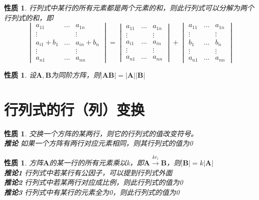 \documentclass[12pt,oneside]{ctexbook}
\newtheorem{property}[subsection]{性质}
\begin{document}
\begin{property}
    行列式中某行的所有元素都是两个元素的和，则此行列式可以分解为两个行列式的和，即
    \[\begin{vmatrix}
        a_{11}&\dots&a_{1n}
        \\\vdots&&\vdots
        \\a_{i1}+b_1&\dots&a_{in}+b_n
        \\\vdots&&\vdots
        \\a_{n1}&\dots&a_{nn}
    \end{vmatrix}
    =\begin{vmatrix}
        a_{11}&\dots&a_{1n}
        \\\vdots&&\vdots
        \\a_{i1}&\dots&a_{in}
        \\\vdots&&\vdots
        \\a_{n1}&\dots&a_{nn}
    \end{vmatrix}+
    \begin{vmatrix}
        a_{11}&\dots&a_{1n}
        \\\vdots&&\vdots
        \\b_1&\dots&b_n
        \\\vdots&&\vdots
        \\a_{n1}&\dots&a_{nn}
    \end{vmatrix}\]
\end{property}
\begin{property}
    设\(\mathbf{A},\mathbf{B}\)为同阶方阵，则\(\rvert \mathbf{A}\mathbf{B} \rvert = \rvert\mathbf{A}\rvert\rvert \mathbf{B}\rvert\)
\end{property}

\section{行列式的行（列）变换}
\begin{property}
    交换一个方阵的某两行，则它的行列式的值改变符号。
    \\ \textbf{推论} 如果一个方阵有两行对应元素相同，则其行列式的值为0
\end{property}

\begin{property}
    方阵\(\mathbf{A}\)的某一行的所有元素乘以k，即\(\mathbf{A}\xrightarrow{kr_i}\mathbf{B}\)，则\(\rvert\mathbf{B}\rvert=k\rvert\mathbf{A}\rvert\)
    \\ \textbf{推论1} 行列式中若某行有公因子，可以提到行列式外面
    \\ \textbf{推论2} 行列式中若某两行对应成比例，则此行列式的值为0
    \\ \textbf{推论3} 行列式中有某行的元素全为0，则此行列式的值为0
\end{property}
\end{document}
